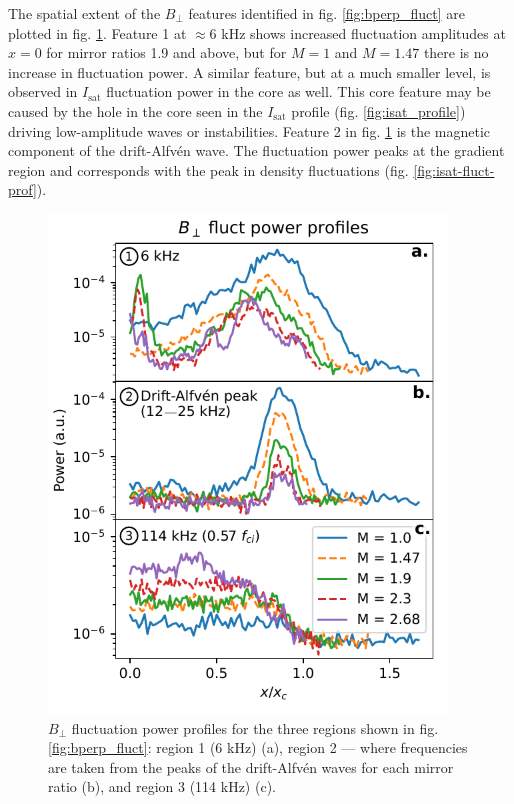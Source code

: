 The spatial extent of the $B_\perp$ features identified in fig. \ref{fig:bperp_fluct} are plotted in fig. \ref{fig:Bperp_power_profiles}. Feature 1 at $\approx 6$ kHz shows increased fluctuation amplitudes at $x=0$ for mirror ratios 1.9 and above, but for $M=1$ and $M=1.47$ there is no increase in fluctuation power. A similar feature, but at a much smaller level, is observed in $I_\text{sat}$ fluctuation power in the core as well. This core feature may be caused by the hole in the core seen in the $I_\text{sat}$ profile (fig. \ref{fig:isat_profile}) driving low-amplitude waves or instabilities. Feature 2 in fig. \ref{fig:Bperp_power_profiles} is the magnetic component of the drift-Alfv\'en wave. The fluctuation power peaks at the gradient region and corresponds with the peak in density fluctuations (fig. \ref{fig:isat-fluct-prof}). 

\begin{figure}
    \centering
    \includegraphics[width=300pt]{figures/fig14.pdf}
    \caption{$B_\perp$ fluctuation power profiles for the three regions shown in fig. \ref{fig:bperp_fluct}: region 1 (6 kHz) (a), region 2 — where frequencies are taken from the peaks of the drift-Alfv\'en waves for each mirror ratio (b), and region 3 (114 kHz) (c).}
    \label{fig:Bperp_power_profiles}
\end{figure}

